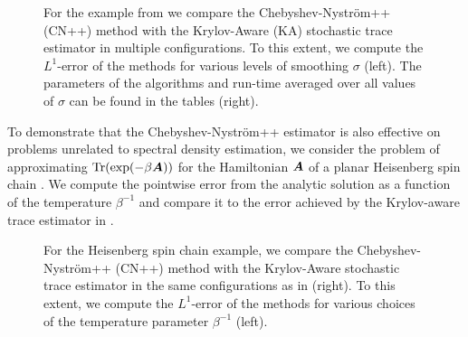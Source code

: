 \begin{figure}[ht]
    \begin{minipage}[c]{.475\linewidth}
        \centering
        
    \end{minipage}\hfill%
    \begin{minipage}[c]{.475\linewidth}
        \vspace{-35pt}
        
        \newline
        \vspace{15pt}
        \newline
        
    \end{minipage}
    \caption{For the example from  we compare the Chebyshev-Nyström++ (CN++) method with the Krylov-Aware (KA) stochastic trace estimator in multiple configurations. To this extent, we compute the $L^1$-error of the methods for various levels of smoothing $\sigma$ (left). The parameters of the algorithms and run-time averaged over all values of $\sigma$ can be found in the tables (right).}
    \label{fig:krylov-aware-density}
\end{figure}

To demonstrate that the Chebyshev-Nyström++ estimator is also effective on problems unrelated to spectral density estimation, we consider the problem of approximating $\operatorname{Tr}(\exp(-\beta \boldsymbol{A}))$ for the Hamiltonian $\boldsymbol{A}$ of a planar Heisenberg spin chain \cite{chen-2023-krylovaware-stochastic}. We compute the pointwise error from the analytic solution as a function of the temperature $\beta^{-1}$ and compare it to the error achieved by the Krylov-aware trace estimator in .

\begin{figure}[ht]
    \begin{minipage}[c]{.475\linewidth}
        \centering
        
    \end{minipage}\hfill%
    \begin{minipage}[c]{.475\linewidth}
        \vspace{-35pt}
        
        \newline
        \vspace{15pt}
        \newline
        
    \end{minipage}
    \caption{For the Heisenberg spin chain example, we compare the Chebyshev-Nyström++ (CN++) method with the Krylov-Aware stochastic trace estimator in the same configurations as in \cite[Table 5.1]{chen-2023-krylovaware-stochastic} (right). To this extent, we compute the $L^1$-error of the methods for various choices of the temperature parameter $\beta^{-1}$ (left).}
    \label{fig:krylov-aware-spin}
\end{figure}


